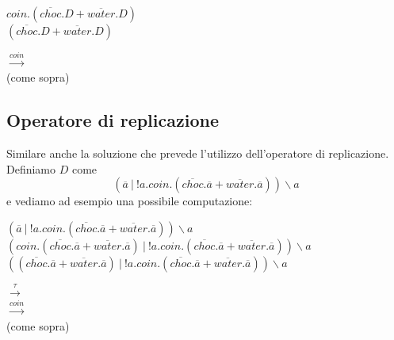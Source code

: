 		\begin{minipage}{0.4\textwidth}
			\begin{flushleft}
				\vspace{5 mm}
				$coin.(\overline{choc}.D + \overline{water}.D)$\\
				\vspace{5 mm}
				$(\overline{choc}.D + \overline{water}.D)$\\
			\end{flushleft}
		\end{minipage}
		\begin{minipage}{0.55\textwidth}
			\begin{flushright}
				\vspace{5 mm}
				$\xrightarrow{coin}$\\
				\vspace{5 mm}
				(come sopra)\\
			\end{flushright}
		\end{minipage}
		
		\subsection{Operatore di replicazione}
		
		\qquad Similare \eacc anche la soluzione che prevede l'utilizzo dell'operatore di replicazione. Definiamo $D$ come
		$$(\overline{a}\ |\ !a.coin.(\overline{choc}.\overline{a} + \overline{water}.\overline{a}))\backslash a$$ e vediamo ad esempio una possibile computazione:
		
		\begin{minipage}{0.6\linewidth}
			\begin{flushleft}
				\vspace{5 mm}
				$(\overline{a}\ |\ !a.coin.(\overline{choc}.\overline{a} + \overline{water}.\overline{a}))\backslash a$\\
				\vspace{5 mm}
				$(coin.(\overline{choc}.\overline{a} + \overline{water}.\overline{a})\ |\ !a.coin.(\overline{choc}.\overline{a} + \overline{water}.\overline{a}))\backslash a$\\
				\vspace{7 mm}
				$((\overline{choc}.\overline{a} + \overline{water}.\overline{a})\ |\ !a.coin.(\overline{choc}.\overline{a} + \overline{water}.\overline{a}))\backslash a$
			\end{flushleft}
		\end{minipage}
		\hfill
		\begin{minipage}{0.1\linewidth}
			\begin{flushright}
				\vspace{5 mm}
				$\xrightarrow{\tau}$\\
				\vspace{8 mm}
				$\xrightarrow{coin}$\\
				\vspace{8 mm}
				(come sopra)
			\end{flushright}
		\end{minipage}
		
